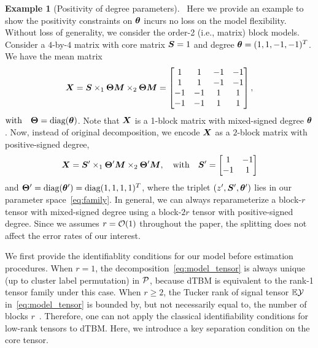 \documentclass[lettersize,journal]{IEEEtran}
\theoremstyle{definition}
\theoremstyle{definition}
\newtheorem{example}{Example}
\begin{document}
\begin{example}[Positivity of degree parameters]~\label{ex:positive}
Here we provide an example to show the positivity constraints on $\boldsymbol{\theta}$ incurs no loss on the model flexibility. Without loss of generality, we consider the order-2 (i.e., matrix) block models. Consider a $4$-by-$4$ matrix with core matrix $\bm S = 1$ and degree $\boldsymbol{\theta}=(1,1,-1,-1)^T$. We have the mean matrix 
\begin{equation}
    \bm X = \bm S \times_1 \boldsymbol{\Theta} \bm M \times_2 \boldsymbol{\Theta}\bm M = \begin{bmatrix}
1 & 1 & -1& -1\\
1 & 1 & -1& -1\\
-1 & -1 & 1& 1\\
-1 & -1 & 1& 1
\end{bmatrix},
\end{equation}
$ \text{with}\quad \boldsymbol{\Theta}=\text{diag}(\boldsymbol{\theta})$. Note that $\bm X$ is a 1-block matrix with mixed-signed degree $\boldsymbol{\theta}$. 
Now, instead of original decomposition, we encode $\bm X$ as a $2$-block matrix with positive-signed degree,
\begin{equation}
\bm X= \bm S' \times_1 \boldsymbol{\Theta}' \bm M \times_2 \boldsymbol{\Theta}' \bm M,\quad \text{with}\quad   \bm S' = \begin{bmatrix} 1 & -1 \\
    -1 & 1
    \end{bmatrix}
\end{equation}
and $ \boldsymbol{\Theta}'=\text{diag}(\boldsymbol{\theta}')=\text{diag}(1, 1, 1, 1)^T$, where the triplet $(z',\bm S', \boldsymbol{\theta}')$ lies in our parameter space~\eqref{eq:family}. In general, we can always reparameterize a block-$r$ tensor with mixed-signed degree using a block-$2r$ tensor with positive-signed degree. Since we assumes $r=\mathcal{O}(1)$ throughout the paper, the splitting does not affect the error rates of our interest.
\end{example}

We first provide the identifiablity conditions for our model before estimation procedures. When $r=1$, the decomposition~\eqref{eq:model_tensor} is always unique (up to cluster label permutation) in $\mathcal{P}$, because dTBM is equivalent to the rank-1 tensor family under this case. When $r\geq 2$, the Tucker rank of signal tensor $\mathbb{E}\mathcal{Y}$ in~\eqref{eq:model_tensor} is bounded by, but not necessarily equal to, the number of blocks $r$~\citep{wang2019multiway}. Therefore, one can not apply the classical identifiability conditions for low-rank tensors to dTBM. Here, we introduce a key separation condition on the core tensor. 
\end{document}
